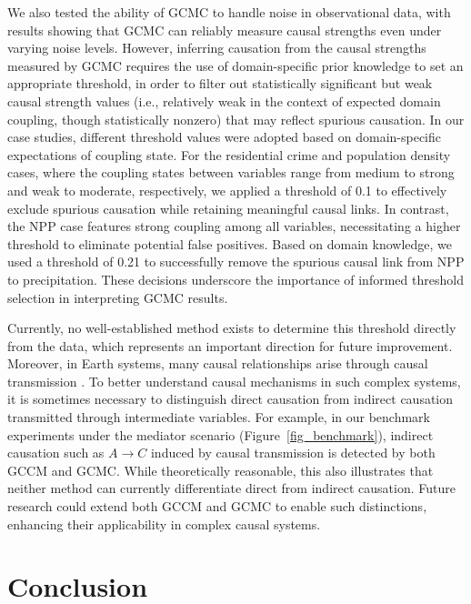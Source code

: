 \documentclass[authoryear,preprint,review,12pt]{elsarticle}
\begin{document}
We also tested the ability of GCMC to handle noise in observational data, with results showing that GCMC can reliably measure causal strengths even under varying noise levels. However, inferring causation from the causal strengths measured by GCMC requires the use of domain-specific prior knowledge to set an appropriate threshold, in order to filter out statistically significant but weak causal strength values (i.e., relatively weak in the context of expected domain coupling, though statistically nonzero) that may reflect spurious causation. In our case studies, different threshold values were adopted based on domain-specific expectations of coupling state. For the residential crime and population density cases, where the coupling states between variables range from medium to strong and weak to moderate, respectively, we applied a threshold of 0.1 to effectively exclude spurious causation while retaining meaningful causal links. In contrast, the NPP case features strong coupling among all variables, necessitating a higher threshold to eliminate potential false positives. Based on domain knowledge, we used a threshold of 0.21 to successfully remove the spurious causal link from NPP to precipitation. These decisions underscore the importance of informed threshold selection in interpreting GCMC results.

Currently, no well-established method exists to determine this threshold directly from the data, which represents an important direction for future improvement. Moreover, in Earth systems, many causal relationships arise through causal transmission \citep{runge2019esstsc,runge2023tsc}. To better understand causal mechanisms in such complex systems, it is sometimes necessary to distinguish direct causation from indirect causation transmitted through intermediate variables. For example, in our benchmark experiments under the mediator scenario (Figure~\ref{fig_benchmark}), indirect causation such as \(A \to C\) induced by causal transmission is detected by both GCCM and GCMC. While theoretically reasonable, this also illustrates that neither method can currently differentiate direct from indirect causation. Future research could extend both GCCM and GCMC to enable such distinctions, enhancing their applicability in complex causal systems.

\section{Conclusion}\label{sec5} 
\end{document}
